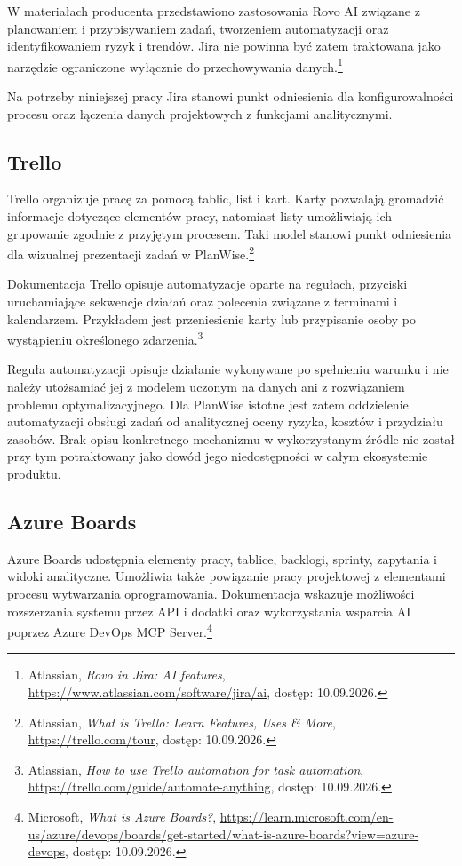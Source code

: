 W materiałach producenta przedstawiono zastosowania Rovo AI związane z planowaniem i przypisywaniem zadań, tworzeniem automatyzacji oraz identyfikowaniem ryzyk i trendów. Jira nie powinna być zatem traktowana jako narzędzie ograniczone wyłącznie do przechowywania danych.\footnote{Atlassian, \textit{Rovo in Jira: AI features}, \url{https://www.atlassian.com/software/jira/ai}, dostęp: 10.09.2026.}

Na potrzeby niniejszej pracy Jira stanowi punkt odniesienia dla konfigurowalności procesu oraz łączenia danych projektowych z funkcjami analitycznymi.


\subsection{Trello}
\label{subsec:trello}

Trello organizuje pracę za pomocą tablic, list i kart. Karty pozwalają gromadzić informacje dotyczące elementów pracy, natomiast listy umożliwiają ich grupowanie zgodnie z przyjętym procesem. Taki model stanowi punkt odniesienia dla wizualnej prezentacji zadań w PlanWise.\footnote{Atlassian, \textit{What is Trello: Learn Features, Uses \& More}, \url{https://trello.com/tour}, dostęp: 10.09.2026.}

Dokumentacja Trello opisuje automatyzacje oparte na regułach, przyciski uruchamiające sekwencje działań oraz polecenia związane z terminami i kalendarzem. Przykładem jest przeniesienie karty lub przypisanie osoby po wystąpieniu określonego zdarzenia.\footnote{Atlassian, \textit{How to use Trello automation for task automation}, \url{https://trello.com/guide/automate-anything}, dostęp: 10.09.2026.}

Reguła automatyzacji opisuje działanie wykonywane po spełnieniu warunku i nie należy utożsamiać jej z modelem uczonym na danych ani z rozwiązaniem problemu optymalizacyjnego. Dla PlanWise istotne jest zatem oddzielenie automatyzacji obsługi zadań od analitycznej oceny ryzyka, kosztów i przydziału zasobów. Brak opisu konkretnego mechanizmu w wykorzystanym źródle nie został przy tym potraktowany jako dowód jego niedostępności w całym ekosystemie produktu.


\subsection{Azure Boards}
\label{subsec:azure-boards}

Azure Boards udostępnia elementy pracy, tablice, backlogi, sprinty, zapytania i widoki analityczne. Umożliwia także powiązanie pracy projektowej z elementami procesu wytwarzania oprogramowania. Dokumentacja wskazuje możliwości rozszerzania systemu przez API i dodatki oraz wykorzystania wsparcia AI poprzez Azure DevOps MCP Server.\footnote{Microsoft, \textit{What is Azure Boards?}, \url{https://learn.microsoft.com/en-us/azure/devops/boards/get-started/what-is-azure-boards?view=azure-devops}, dostęp: 10.09.2026.}

